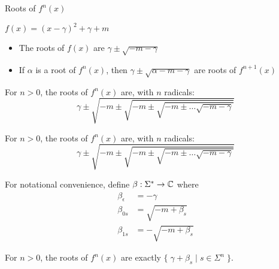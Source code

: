 \begin{frame}[allowframebreaks]{Roots of $f^n(x)$}


  $f(x) = (x-\gamma)^2+\gamma+m$

  \begin{itemize}
    \item The roots of $f(x)$ are $\gamma\pm\sqrt{-m-\gamma}$
    \item If $\alpha$ is a root of $f^n(x)$, then $\gamma\pm\sqrt{\alpha-m-\gamma}$ are roots of $f^{n+1}(x)$
  \end{itemize}

  \begin{obs}
    For $n>0$, the roots of $f^n(x)$ are, with $n$ radicals:
    $$\gamma\pm\sqrt{-m\pm\sqrt{-m\pm\sqrt{-m\pm\ldots\sqrt{-m-\gamma}}}}$$
  \end{obs}

  \framebreak

  \begin{obs}
    For $n>0$, the roots of $f^n(x)$ are, with $n$ radicals:
    $$\gamma\pm\sqrt{-m\pm\sqrt{-m\pm\sqrt{-m\pm\ldots\sqrt{-m-\gamma}}}}$$
  \end{obs}

  For notational convenience, define $\beta : \Sigma^* \rightarrow \mathbb{C}$ where
  \begin{align*}
    \beta_{\epsilon} &= -\gamma \\
    \beta_{0s} &= \sqrt{-m+\beta_s} \\ 
    \beta_{1s} &= -\sqrt{-m+\beta_s}
  \end{align*}

  For $n>0$, the roots of $f^n(x)$ are exactly $\{\;\gamma+\beta_s\mid s\in\Sigma^n\;\}$.

\end{frame}

